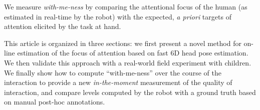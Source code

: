 \documentclass{sig-alternate}
\begin{document}
We measure \emph{with-me-ness} by comparing the attentional focus of the human
(as estimated in real-time by the robot) with the expected, {\it a priori}
targets of attention elicited by the task at hand.

This article is organized in three sections: we first present a novel method for
on-line estimation of the focus of attention based on fast 6D head pose
estimation. We then validate this approach with a real-world field experiment
with children. We finally show how to compute ``with-me-ness'' over the course
of the interaction to provide a new \emph{in-the-moment} measurement of the
quality of interaction, and compare levels computed by the robot with a ground
truth based on manual post-hoc annotations.

%
%
%
\end{document}
